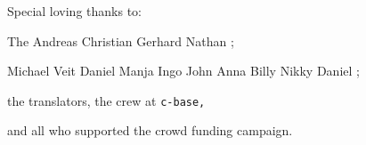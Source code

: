   Special loving thanks to:
  
  The  
  Andreas 
  Christian 
  Gerhard 
  Nathan ;
  
  Michael 
  Veit  
  Daniel 
  Manja  
  Ingo 
  John  
  Anna  
  Billy  
  Nikky   
  Daniel ; 
  
  the translators, the crew at \texttt{c-base,} 
  
  and all who supported the crowd funding campaign.
  